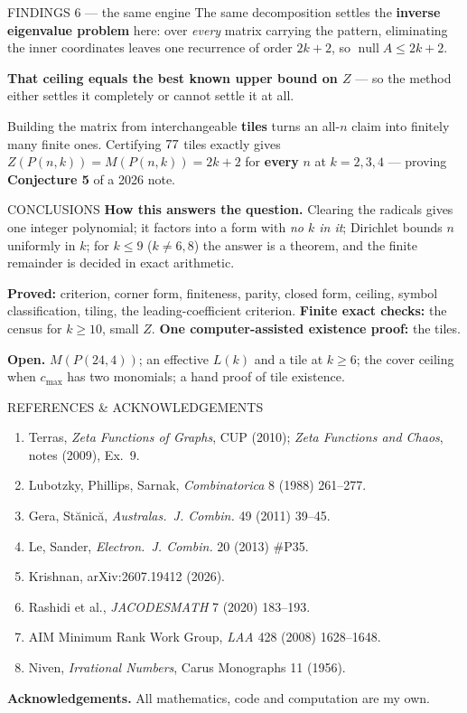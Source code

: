\documentclass[aspectratio=169,14pt]{beamer}
\newcommand{\key}[1]{\textcolor{myblue}{\textbf{#1}}}
\newcommand{\kb}[1]{\begin{center}\colorbox{mylight}{\parbox{0.94\textwidth}{#1}}\end{center}}
\begin{document}
\begin{frame}{FINDINGS 6 --- the same engine}
The same decomposition settles the \key{inverse eigenvalue problem} here: over
\emph{every} matrix carrying the pattern, eliminating the inner coordinates
leaves one recurrence of order $2k+2$, so $\operatorname{null}A\le2k+2$.

\key{That ceiling equals the best known upper bound on $Z$} --- so the method
either settles it completely or cannot settle it at all.

\kb{Building the matrix from interchangeable \key{tiles} turns an all-$n$ claim
into finitely many finite ones. Certifying $77$ tiles exactly gives
$Z(P(n,k))=M(P(n,k))=2k+2$ for \key{every} $n$ at $k=2,3,4$ --- proving
\key{Conjecture 5} of a 2026 note.}
\end{frame}

\begin{frame}{CONCLUSIONS}
\key{How this answers the question.} Clearing the radicals gives one integer
polynomial; it factors into a form with \emph{no $k$ in it}; Dirichlet bounds
$n$ uniformly in $k$; for $k\le9$ ($k\ne6,8$) the answer is a theorem, and the
finite remainder is decided in exact arithmetic.

\key{Proved:} criterion, corner form, finiteness, parity, closed form,
ceiling, symbol classification, tiling, the leading-coefficient criterion. \key{Finite exact checks:} the census
for $k\ge10$, small $Z$. \key{One computer-assisted existence proof:} the tiles.

\key{Open.} $M(P(24,4))$; an effective $L(k)$ and a tile at $k\ge6$; the
cover ceiling when $c_{\max}$ has two monomials; a hand proof of tile existence.
\end{frame}

\begin{frame}{REFERENCES \& ACKNOWLEDGEMENTS}
\begin{enumerate}\setlength\itemsep{0pt}
\item Terras, \emph{Zeta Functions of Graphs}, CUP (2010); \emph{Zeta
      Functions and Chaos}, notes (2009), Ex.\ 9.
\item Lubotzky, Phillips, Sarnak, \emph{Combinatorica} 8 (1988) 261--277.
\item Gera, St\u{a}nic\u{a}, \emph{Australas.\ J. Combin.} 49 (2011) 39--45.
\item Le, Sander, \emph{Electron.\ J. Combin.} 20 (2013) \#P35.
\item Krishnan, arXiv:2607.19412 (2026).
\item Rashidi et al., \emph{JACODESMATH} 7 (2020) 183--193.
\item AIM Minimum Rank Work Group, \emph{LAA} 428 (2008) 1628--1648.
\item Niven, \emph{Irrational Numbers}, Carus Monographs 11 (1956).
\end{enumerate}
\key{Acknowledgements.} All mathematics, code and computation are my own.
\end{frame}
\end{document}
